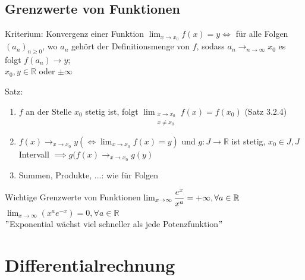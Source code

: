 \documentclass[a4paper,10pt]{article}
\begin{document}
\subsection{Grenzwerte von Funktionen}
\begin{tbox}
    {Kriterium: Konvergenz einer Funktion}
    $\lim_{x\to x_0}f(x)=y\iff$ für alle Folgen $(a_n)_{n\ge0}$, wo $a_n$ gehört der Definitionsmenge von $f$, sodass $a_n\longrightarrow_{n\to\infty} x_0$ es folgt $f(a_n)\longrightarrow y$; 
    \\$x_0, y \in \mathbb R$ oder $\pm\infty$
\end{tbox}
\begin{tbox}
    {Satz:}
    \begin{enumerate}
        \item $f$ an der Stelle $x_0$ stetig ist, folgt $\displaystyle\lim_{\substack{x\to x_0\\ x\neq x_0}}f(x)= f(x_0)$ (Satz 3.2.4)
        \item $f(x)\longrightarrow_{x\to x_0} y (\iff\lim_{x\to x_0} f(x)=y)$ und $g:J\longrightarrow \mathbb R$ ist stetig, $x_0\in J, J$ Intervall $\implies g(f(x)\longrightarrow_{x\to x_0} g(y)$ 
        \item Summen, Produkte, ...: wie für Folgen
    \end{enumerate}
\end{tbox}
\begin{tipbox}
    {Wichtige Grenzwerte von Funktionen}
    $\lim_{x\to\infty}\dfrac{e^x}{x^a}=+\infty, 
    \\ \forall a \in \mathbb R$
    $\lim_{x\to\infty}(x^ae^{-x})=0, \forall a\in\mathbb R$
    \\ $"$Exponential wächst viel schneller als jede Potenzfunktion$"$
\end{tipbox}
\section{Differentialrechnung}
\end{document}
